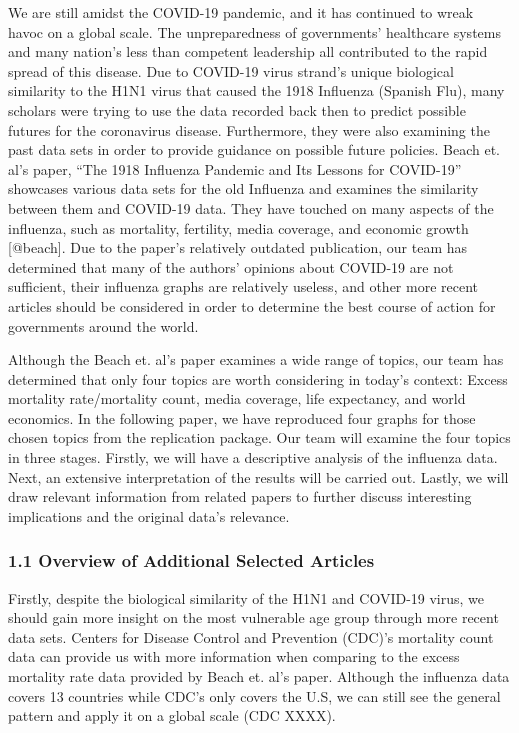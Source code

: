 \documentclass[
]{article}
\begin{document}
We are still amidst the COVID-19 pandemic, and it has continued to wreak
havoc on a global scale. The unpreparedness of governments' healthcare
systems and many nation's less than competent leadership all contributed
to the rapid spread of this disease. Due to COVID-19 virus strand's
unique biological similarity to the H1N1 virus that caused the 1918
Influenza (Spanish Flu), many scholars were trying to use the data
recorded back then to predict possible futures for the coronavirus
disease. Furthermore, they were also examining the past data sets in
order to provide guidance on possible future policies. Beach et. al's
paper, ``The 1918 Influenza Pandemic and Its Lessons for COVID-19''
showcases various data sets for the old Influenza and examines the
similarity between them and COVID-19 data. They have touched on many
aspects of the influenza, such as mortality, fertility, media coverage,
and economic growth {[}@beach{]}. Due to the paper's relatively outdated
publication, our team has determined that many of the authors' opinions
about COVID-19 are not sufficient, their influenza graphs are relatively
useless, and other more recent articles should be considered in order to
determine the best course of action for governments around the world.

Although the Beach et. al's paper examines a wide range of topics, our
team has determined that only four topics are worth considering in
today's context: Excess mortality rate/mortality count, media coverage,
life expectancy, and world economics. In the following paper, we have
reproduced four graphs for those chosen topics from the replication
package. Our team will examine the four topics in three stages. Firstly,
we will have a descriptive analysis of the influenza data. Next, an
extensive interpretation of the results will be carried out. Lastly, we
will draw relevant information from related papers to further discuss
interesting implications and the original data's relevance.

\hypertarget{overview-of-additional-selected-articles}{%
\subsubsection{1.1 Overview of Additional Selected
Articles}\label{overview-of-additional-selected-articles}}

Firstly, despite the biological similarity of the H1N1 and COVID-19
virus, we should gain more insight on the most vulnerable age group
through more recent data sets. Centers for Disease Control and
Prevention (CDC)'s mortality count data can provide us with more
information when comparing to the excess mortality rate data provided by
Beach et. al's paper. Although the influenza data covers 13 countries
while CDC's only covers the U.S, we can still see the general pattern
and apply it on a global scale (CDC XXXX).
\end{document}
